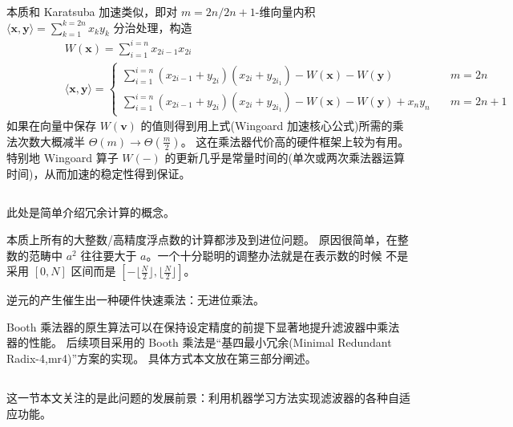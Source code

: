 本质和 Karatsuba 加速类似，即对 $m = 2n/2n+1$-维向量内积 $\langle \mathbf{x}, \mathbf{y}\rangle = \sum_{k=1}^{k=2n}x_k y_k$
分治处理，构造
\begin{align*}
    &\qquad\qquad     W(\mathbf{x}) = \sum_{i=1}^{i=n} x_{2i-1} x_{2i}\\
    &\qquad\qquad    \langle \mathbf{x}, \mathbf{y}\rangle =
    \begin{cases}
        \sum_{i=1}^{i=n}(x_{2i-1} + y_{2i})(x_{2i} + y_{2i_1}) - W(\mathbf{x}) - W(\mathbf{y}) \quad& m=2n\\
        \sum_{i=1}^{i=n}(x_{2i-1} + y_{2i})(x_{2i} + y_{2i_1}) - W(\mathbf{x}) - W(\mathbf{y})  + x_n y_n 
        \quad& m=2n+1
    \end{cases} 
\end{align*}
如果在向量中保存 $W(\mathbf{v})$ 的值则得到用上式(Wingoard 加速核心公式)所需的乘法次数大概减半 $\Theta(m) \to \Theta(\frac{m}{2})$。
这在乘法器代价高的硬件框架上较为有用。特别地 Wingoard 算子 $W(-)$ 的更新几乎是常量时间的(单次或两次乘法器运算时间)，从而加速的稳定性得到保证。

\subsection{}

此处是简单介绍冗余计算的概念。

本质上所有的大整数/高精度浮点数的计算都涉及到进位问题。
原因很简单，在整数的范畴中 $a^2$ 往往要大于 $a$。一个十分聪明的调整办法就是在表示数的时候
不是采用 $[0,N]$ 区间而是 $[-\lfloor\frac{N}{2}\rfloor,\lfloor\frac{N}{2}\rfloor]$。

逆元的产生催生出一种硬件快速乘法：无进位乘法。

Booth 乘法器的原生算法可以在保持设定精度的前提下显著地提升滤波器中乘法器的性能。
后续项目采用的 Booth 乘法是``基四最小冗余(Minimal Redundant Radix-4,mr4)''方案的实现。
具体方式本文放在第三部分阐述。

\subsection{}

这一节本文关注的是此问题的发展前景：利用机器学习方法实现滤波器的各种自适应功能。

\paragraph{}

